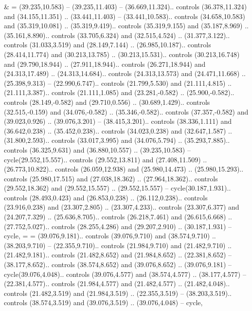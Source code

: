 {&} = {(39.235,10.583) -- (39.235,11.403) -- (36.669,11.324).. controls (36.378,11.324) and (34.155,11.351) .. (33.441,11.403) -- (33.441,10.583).. controls (34.658,10.583) and (35.319,10.081) .. (35.319,9.419).. controls (35.319,9.155) and (35.187,8.969) .. (35.161,8.890).. controls (33.705,6.324) and (32.515,4.524) .. (31.377,3.122).. controls (31.033,3.519) and (28.149,7.144) .. (26.985,10.187).. controls (28.414,11.774) and (30.213,13.785) .. (30.213,15.531).. controls (30.213,16.748) and (29.790,18.944) .. (27.911,18.944).. controls (26.271,18.944) and (24.313,17.489) .. (24.313,14.684).. controls (24.313,13.573) and (24.471,11.668) .. (25.398,9.313) -- (22.990,6.747).. controls (21.799,5.530) and (21.111,4.815) .. (21.111,3.387).. controls (21.111,1.085) and (23.281,-0.582) .. (25.900,-0.582).. controls (28.149,-0.582) and (29.710,0.556) .. (30.689,1.429).. controls (32.515,-0.159) and (34.076,-0.582) .. (35.346,-0.582).. controls (37.357,-0.582) and (39.023,0.926) .. (39.076,3.201) -- (38.415,3.201).. controls (38.336,1.111) and (36.642,0.238) .. (35.452,0.238).. controls (34.023,0.238) and (32.647,1.587) .. (31.800,2.593).. controls (33.017,3.995) and (34.076,5.794) .. (35.293,7.885).. controls (36.325,9.631) and (36.880,10.557) .. (39.235,10.583) -- cycle(29.552,15.557).. controls (29.552,13.811) and (27.408,11.509) .. (26.773,10.822).. controls (26.059,12.938) and (25.980,14.473) .. (25.980,15.293).. controls (25.980,17.515) and (27.038,18.362) .. (27.964,18.362).. controls (29.552,18.362) and (29.552,15.557) .. (29.552,15.557) -- cycle(30.187,1.931).. controls (28.493,0.423) and (26.853,0.238) .. (26.112,0.238).. controls (23.916,0.238) and (23.307,2.805) .. (23.307,4.233).. controls (23.307,6.377) and (24.207,7.329) .. (25.636,8.705).. controls (26.218,7.461) and (26.615,6.668) .. (27.752,5.027).. controls (28.255,4.286) and (29.207,2.910) .. (30.187,1.931) -- cycle},
{=} = {(39.076,9.181).. controls (39.076,9.710) and (38.574,9.710) .. (38.203,9.710) -- (22.355,9.710).. controls (21.984,9.710) and (21.482,9.710) .. (21.482,9.181).. controls (21.482,8.652) and (21.984,8.652) .. (22.381,8.652) -- (38.177,8.652).. controls (38.574,8.652) and (39.076,8.652) .. (39.076,9.181) -- cycle(39.076,4.048).. controls (39.076,4.577) and (38.574,4.577) .. (38.177,4.577) -- (22.381,4.577).. controls (21.984,4.577) and (21.482,4.577) .. (21.482,4.048).. controls (21.482,3.519) and (21.984,3.519) .. (22.355,3.519) -- (38.203,3.519).. controls (38.574,3.519) and (39.076,3.519) .. (39.076,4.048) -- cycle},
